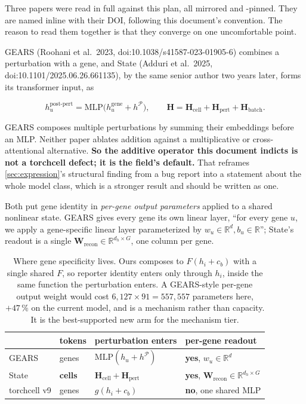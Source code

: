 Three papers were read in full against this plan, all mirrored and -pinned.
They are named inline with their DOI, following this document's convention. The reason to
read them together is that they converge on one uncomfortable point.

GEARS (Roohani et al.\ 2023, doi:10.1038/s41587-023-01905-6) combines a perturbation with a
gene, and State (Adduri et al.\ 2025, doi:10.1101/2025.06.26.661135), by the same senior
author two years later, forms its transformer input, as

$$h_u^{\mathrm{post\text{-}pert}} = \mathrm{MLP}\big(h_u^{\mathrm{gene}} + h^{\mathcal P}\big),
\qquad
\mathbf H = \mathbf H_{\mathrm{cell}} + \mathbf H_{\mathrm{pert}} + \mathbf H_{\mathrm{batch}} .$$

GEARS composes multiple perturbations by summing their embeddings before an MLP. Neither
paper ablates addition against a multiplicative or cross-attentional alternative.
\textbf{So the additive operator this document indicts is not a torchcell defect; it is the
field's default.} That reframes \cref{sec:expression}'s structural finding from a bug report
into a statement about the whole model class, which is a stronger result and should be
written as one.

 Both put
gene identity in \emph{per-gene output parameters} applied to a shared nonlinear state.
GEARS gives every gene its own linear layer, ``for every gene $u$, we apply a gene-specific
linear layer parameterized by $w_u \in \mathbb R^d, b_u \in \mathbb R$''; State's readout is
a single $\mathbf W_{\mathrm{recon}} \in \mathbb R^{d_h \times G}$, one column per gene.

\begin{table}[htbp]
\centering\footnotesize
\begin{tabular}{llll}
\toprule
 & tokens & perturbation enters & per-gene readout \\
\midrule
GEARS         & genes & $\mathrm{MLP}(h_u + h^{\mathcal P})$ & \textbf{yes}, $w_u\in\mathbb R^{d}$ \\
State         & \textbf{cells} & $\mathbf H_{\mathrm{cell}} + \mathbf H_{\mathrm{pert}}$ & \textbf{yes}, $\mathbf W_{\mathrm{recon}}\in\mathbb R^{d_h\times G}$ \\
torchcell v9  & genes & $g(h_i + c_b)$ & \textbf{no}, one shared MLP \\
\bottomrule
\end{tabular}
\caption[]{Where gene specificity lives. Ours composes to $F(h_i + c_b)$ with a single
shared $F$, so reporter identity enters only through $h_i$, inside the same function the
perturbation enters. A GEARS-style per-gene output weight would cost
$6{,}127 \times 91 = 557{,}557$ parameters here, $+47\,\%$ on the current model, and is a
mechanism rather than capacity. It is the best-supported new arm for the mechanism tier.}
\label{tab:related-operators}
\end{table}

